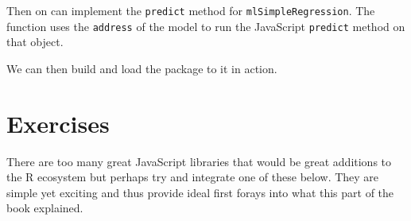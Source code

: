 \documentclass[
  10pt,
]{krantz}
\makeatletter
\newenvironment{Shaded}{\begin{snugshade}}{\end{snugshade}}
\newcommand{\CommentTok}[1]{\textcolor[rgb]{0.37,0.37,0.37}{\textit{#1}}}
\newcommand{\ControlFlowTok}[1]{\textcolor[rgb]{0.27,0.27,0.27}{\textbf{#1}}}
\newcommand{\DecValTok}[1]{\textcolor[rgb]{0.06,0.06,0.06}{#1}}
\newcommand{\KeywordTok}[1]{\textcolor[rgb]{0.27,0.27,0.27}{\textbf{#1}}}
\newcommand{\NormalTok}[1]{#1}
\newcommand{\OperatorTok}[1]{\textcolor[rgb]{0.43,0.43,0.43}{\textbf{#1}}}
\newcommand{\StringTok}[1]{\textcolor[rgb]{0.5,0.5,0.5}{#1}}
\newenvironment{kframe}{%
\medskip{}
\setlength{\fboxsep}{.8em}
 \def\at@end@of@kframe{}%
 \ifinner\ifhmode%
  \def\at@end@of@kframe{\end{minipage}}%
  \begin{minipage}{\columnwidth}%
 \fi\fi%
 \def\FrameCommand##1{\hskip\@totalleftmargin \hskip-\fboxsep
 \colorbox{shadecolor}{##1}\hskip-\fboxsep
     \hskip-\linewidth \hskip-\@totalleftmargin \hskip\columnwidth}%
 \MakeFramed {\advance\hsize-\width
   \@totalleftmargin\z@ \linewidth\hsize
   \@setminipage}}%
 {\par\unskip\endMakeFramed%
 \at@end@of@kframe}
\renewenvironment{Shaded}{\begin{kframe}}{\end{kframe}}
\makeatother
\begin{document}
Then on can implement the \texttt{predict} method for \texttt{mlSimpleRegression}. The function uses the \texttt{address} of the model to run the JavaScript \texttt{predict} method on that object.

\begin{Shaded}
\end{Shaded}

We can then build and load the package to it in action.

\begin{Shaded}
\end{Shaded}

\hypertarget{v8-ml-exercises}{%
\section{Exercises}\label{v8-ml-exercises}}

There are too many great JavaScript libraries that would be great additions to the R ecosystem but perhaps try and integrate one of these below. They are simple yet exciting and thus provide ideal first forays into what this part of the book explained.
\end{document}
